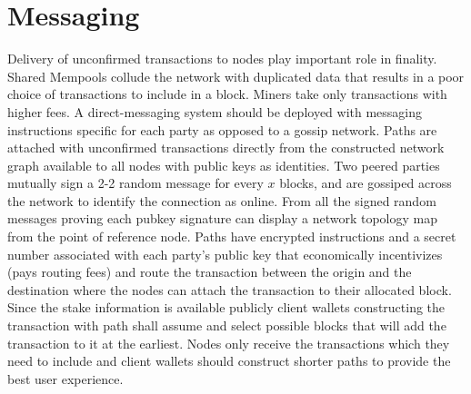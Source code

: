 \documentclass[a4paper,10pt]{article}
\begin{document}
\section{Messaging}
Delivery of unconfirmed transactions to nodes play important role in finality. Shared Mempools collude the network with duplicated data that results in a poor choice of transactions to include in a block. Miners take only transactions with higher fees. A direct-messaging system should be deployed with messaging instructions specific for each party as opposed to a gossip network. Paths are attached with unconfirmed transactions directly from the constructed network graph available to all nodes with public keys as identities. Two peered parties mutually sign a 2-2 random message for every $x$ blocks, and are gossiped across the network to identify the connection as online. From all the signed random messages proving each pubkey signature can display a network topology map from the point of reference node. Paths have encrypted instructions and a secret number associated with each party's public key that economically incentivizes (pays routing fees) and route the transaction between the origin and the destination where the nodes can attach the transaction to their allocated block. Since the stake information is available publicly client wallets constructing the transaction with path shall assume and select possible blocks that will add the transaction to it at the earliest. Nodes only receive the transactions which they need to include and client wallets should construct shorter paths to provide the best user experience.
\end{document}
